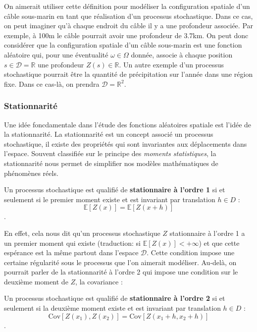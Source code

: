 \documentclass[10pt]{article} %
\begin{document}
On aimerait utiliser cette définition pour modéliser la configuration spatiale d'un câble sous-marin en tant que réalisation d'un processus stochastique.
Dans ce cas, on peut imaginer qu'à chaque endroit du câble il y a une profondeur associée. Par exemple, à 100m le câble pourrait avoir une profondeur de 3.7km. On peut donc
considérer que la configuration spatiale d'un câble sous-marin est une fonction aléatoire qui, pour une éventualité $\omega \in \Omega$ donnée, associe à chaque position
$s \in \mathcal{D} = \mathbb{R}$ une profondeur $Z(s) \in \mathbb{R}$. Un autre exemple d'un processus stochastique pourrait être la quantité de précipitation sur l'année dans une région fixe. Dans ce cas-là, on prendra $\mathcal{D} = \mathbb{R}^2$.

\subsubsection{Stationnarité}

Une idée foncdamentale dans l'étude des fonctions aléatoires spatiale est l'idée de la stationnarité. La stationnarité est un concept associé un processus stochastique,
il existe des propriétés qui sont invariantes aux déplacements dans l'espace. Souvent classifiée sur le principe des \textit{moments statistiques}, la stationnarité nous permet de simplifier nos modèles mathématiques de
phénomènes réels.

\begin{definition}
    Un processus stochastique est qualifié de \textbf{stationnaire à l'ordre 1} si et seulement si le premier moment existe et est invariant par translation $h \in D$ :
    $$ \mathbb{E}[Z(x)] = \mathbb{E}[Z(x + h)]$$.
\end{definition}

En effet, cela nous dit qu'un processus stochastique $Z$ stationnaire à l'ordre 1 a un premier moment qui existe (traduction: si $\mathbb{E}[Z(x)] < +\infty$) et que cette espérance
est la même partout dans l'espace $\mathcal{D}$. Cette condition impose une certaine régularité sous le processus que l'on aimerait modéliser. Au-delà, on pourrait parler de la stationnarité
à l'ordre 2 qui impose une condition sur le deuxième moment de $Z$, la covariance :

\begin{definition}
    Un processus stochastique est qualifié de \textbf{stationnaire à l'ordre 2} si et seulement si la deuxième moment existe et est invariant par translation $h \in D$ :
    $$ \mathrm{Cov}[Z(x_1), Z(x_2)] = \mathrm{Cov}[Z(x_1 + h, x_2 + h)]$$.
\end{definition}
\end{document}
